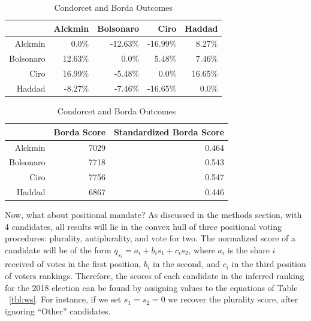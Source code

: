 \documentclass[hidelinks,11pt]{article}
\begin{document}
\begin{table}[h]
  \begin{adjustwidth}{3cm}{}
\begin{subtable}[t]{0.48\textwidth}
\centering
          \begin{tabular}{rrrrr}
            &  Alckmin & Bolsonaro & Ciro & Haddad
            \\\hline
            Alckmin & 0.0\% & -12.63\% & -16.99\% & 8.27\% \\
            Bolsonaro & 12.63\% & 0.0\% & 5.48\% & 7.46\% \\
            Ciro & 16.99\% & -5.48\% & 0.0\% & 16.65\% \\
            Haddad & -8.27\% & -7.46\% & -16.65\% & 0.0\% \\\hline
          \end{tabular}
    \caption{Pairwise Margins}
     \label{tbl:margins}
   \end{subtable}
   \vspace*{0.3cm}

\begin{subtable}[t]{0.48\textwidth}
\centering
\begin{tabular}{rrr}
  \hline
 & Borda Score  & Standardized Borda Score\\
  \hline
Alckmin & 7029 & 0.464 \\
  Bolsonaro & 7718 & 0.543 \\
  Ciro & 7756 &  0.547\\
  Haddad & 6867 & 0.446 \\
   \hline
\end{tabular}
\caption{Borda Count Outcome}
\label{tbl:borda}
\end{subtable}
\end{adjustwidth}
\caption{Condorcet and Borda Outcomes}
\label{tbl:overallresult}
\end{table}

Now, what about positional mandate? As discussed in the methods section, with 4
candidates, all results will lie in the convex hull of three positional voting
procedures: plurality, antiplurality, and vote for two. The normalized
score of a candidate will be of the form
\(q_{s_{i}} = a_{i} + b_{i}s_{1} + c_{i}s_{2}\), where \(a_{i}\) is the share
\(i\) received of votes in the first position, \(b_{i}\) in the second, and
\(c_{i}\) in the third position of voters rankings. Therefore, the scores of
each candidate in the inferred ranking for the 2018 election can be found by
assigning values to the equations of Table ~\ref{tbl:ws}. For instance, if we
set \(s_{1} = s_{2} = 0\) we recover the plurality score, after ignoring
``Other'' candidates.
\end{document}
